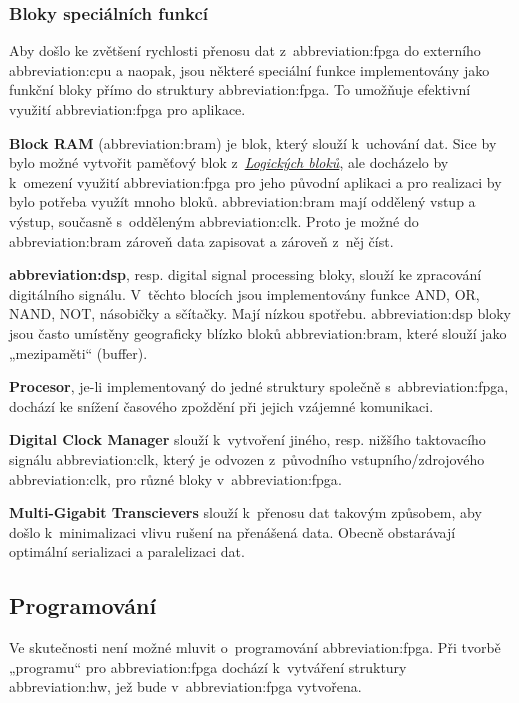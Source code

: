 \documentclass[a4paper, twoside, 11pt]{article}
\begin{document}
		\subsubsection{Bloky speciálních funkcí}
			Aby došlo ke zvětšení rychlosti přenosu dat z~\gls{abbreviation:fpga} do externího \gls{abbreviation:cpu} a naopak, jsou některé speciální funkce implementovány jako funkční bloky přímo do struktury \gls{abbreviation:fpga}. To umožňuje efektivní využití \gls{abbreviation:fpga} pro aplikace. \cite{Sass2010}\par
			\textbf{Block RAM} (\gls{abbreviation:bram}) je blok, který slouží k~uchování dat. Sice by bylo možné vytvořit paměťový blok z~\hyperref[subsubsec:logicke-bloky]{\textit{Logických bloků}}, ale docházelo by k~omezení využití \gls{abbreviation:fpga} pro jeho původní aplikaci a pro realizaci by bylo potřeba využít mnoho bloků. \gls{abbreviation:bram} mají oddělený vstup a výstup, současně s~odděleným \gls{abbreviation:clk}. Proto je možné do \gls{abbreviation:bram} zároveň data zapisovat a zároveň z~něj číst. \cite{Sass2010}\par
			\textbf{\gls{abbreviation:dsp}}, resp. digital signal processing bloky, slouží ke zpracování digitálního signálu. V~těchto blocích jsou implementovány funkce AND, OR, NAND, NOT, násobičky a sčítačky. Mají nízkou spotřebu. \gls{abbreviation:dsp} bloky jsou často umístěny geograficky blízko bloků \gls{abbreviation:bram}, které slouží jako „mezipaměti“ (buffer). \cite{Sass2010}\par
			\textbf{Procesor}, je-li implementovaný do jedné struktury společně s~\gls{abbreviation:fpga}, dochází ke snížení časového zpoždění při jejich vzájemné komunikaci. \cite{Sass2010}\par
			\textbf{Digital Clock Manager} slouží k~vytvoření jiného, resp. nižšího taktovacího signálu \gls{abbreviation:clk}, který je odvozen z~původního vstupního/zdrojového \gls{abbreviation:clk}, pro různé bloky v~\gls{abbreviation:fpga}. \cite{Sass2010}\par
			\textbf{Multi-Gigabit Transcievers} slouží k~přenosu dat takovým způsobem, aby došlo k~minimalizaci vlivu rušení na přenášená data. Obecně obstarávají optimální serializaci a paralelizaci dat. \cite{Sass2010}\par
		\subsection{Programování}
			Ve skutečnosti není možné mluvit o~programování \gls{abbreviation:fpga}. Při tvorbě „programu“ pro \gls{abbreviation:fpga} dochází k~vytváření struktury \gls{abbreviation:hw}, jež bude v~\gls{abbreviation:fpga} vytvořena.
\end{document}
